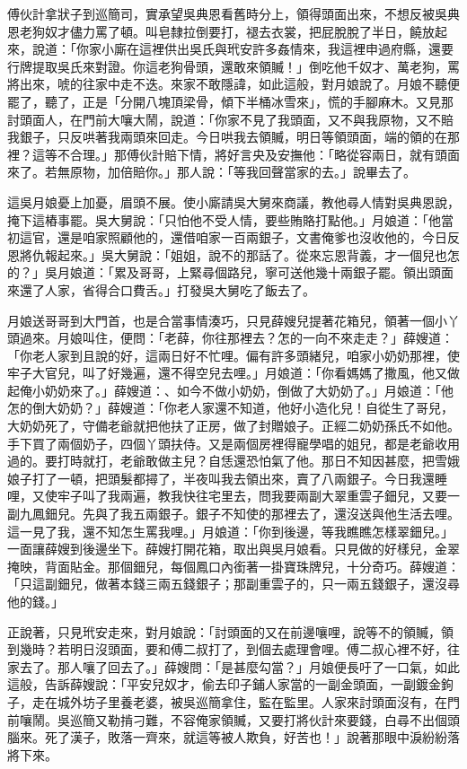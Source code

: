 \begin{showcontents}{}
傅伙計拿狀子到巡簡司，實承望吳典恩看舊時分上，領得頭面出來，不想反被吳典恩老狗奴才儘力罵了頓。叫皂隸拉倒要打，褪去衣裳，把屁脫脫了半日，饒放起來，說道：「你家小廝在這裡供出吳氏與玳安許多姦情來，我這裡申過府縣，還要行牌提取吳氏來對證。你這老狗骨頭，還敢來領贓！」倒吃他千奴才、萬老狗，罵將出來，唬的往家中走不迭。來家不敢隱諱，如此這般，對月娘說了。月娘不聽便罷了，聽了，正是「分開八塊頂梁骨，傾下半桶冰雪來」，慌的手腳麻木。又見那討頭面人，在門前大嚷大鬧，說道：「你家不見了我頭面，又不與我原物，又不賠我銀子，只反哄著我兩頭來回走。今日哄我去領贓，明日等領頭面，端的領的在那裡？這等不合理。」那傅伙計賠下情，將好言央及安撫他：「略從容兩日，就有頭面來了。若無原物，加倍賠你。」那人說：「等我回聲當家的去。」說畢去了。

這吳月娘憂上加憂，眉頭不展。使小廝請吳大舅來商議，教他尋人情對吳典恩說，掩下這樁事罷。吳大舅說：「只怕他不受人情，要些賄賂打點他。」月娘道：「他當初這官，還是咱家照顧他的，還借咱家一百兩銀子，文書俺爹也沒收他的，今日反恩將仇報起來。」吳大舅說：「姐姐，說不的那話了。從來忘恩背義，才一個兒也怎的？」吳月娘道：「累及哥哥，上緊尋個路兒，寧可送他幾十兩銀子罷。領出頭面來還了人家，省得合口費舌。」打發吳大舅吃了飯去了。

月娘送哥哥到大門首，也是合當事情湊巧，只見薛嫂兒提著花箱兒，領著一個小丫頭過來。月娘叫住，便問：「老薛，你往那裡去？怎的一向不來走走？」薛嫂道： 「你老人家到且說的好，這兩日好不忙哩。偏有許多頭緒兒，咱家小奶奶那裡，使牢子大官兒，叫了好幾遍，還不得空兒去哩。」月娘道：「你看媽媽了撒風，他又做起俺小奶奶來了。」薛嫂道：、如今不做小奶奶，倒做了大奶奶了。」月娘道：「他怎的倒大奶奶？」薛嫂道：「你老人家還不知道，他好小造化兒！自從生了哥兒，大奶奶死了，守備老爺就把他扶了正房，做了封贈娘子。正經二奶奶孫氏不如他。手下買了兩個奶子，四個丫頭扶侍。又是兩個房裡得寵學唱的姐兒，都是老爺收用過的。要打時就打，老爺敢做主兒？自恁還恐怕氣了他。那日不知因甚麼，把雪娥娘子打了一頓，把頭髮都撏了，半夜叫我去領出來，賣了八兩銀子。今日我還睡哩，又使牢子叫了我兩遍，教我快往宅里去，問我要兩副大翠重雲子鈿兒，又要一副九鳳鈿兒。先與了我五兩銀子。銀子不知使的那裡去了，還沒送與他生活去哩。這一見了我，還不知怎生罵我哩。」月娘道：「你到後邊，等我瞧瞧怎樣翠鈿兒。」一面讓薛嫂到後邊坐下。薛嫂打開花箱，取出與吳月娘看。只見做的好樣兒，金翠掩映，背面貼金。那個鈿兒，每個鳳口內銜著一掛寶珠牌兒，十分奇巧。薛嫂道：「只這副鈿兒，做著本錢三兩五錢銀子；那副重雲子的，只一兩五錢銀子，還沒尋他的錢。」

正說著，只見玳安走來，對月娘說：「討頭面的又在前邊嚷哩，說等不的領贓，領到幾時？若明日沒頭面，要和傅二叔打了，到個去處理會哩。傅二叔心裡不好，往家去了。那人嚷了回去了。」薛嫂問：「是甚麼勾當？」月娘便長吁了一口氣，如此這般，告訴薛嫂說：「平安兒奴才，偷去印子鋪人家當的一副金頭面，一副鍍金鉤子，走在城外坊子里養老婆，被吳巡簡拿住，監在監里。人家來討頭面沒有，在門前嚷鬧。吳巡簡又勒掯刁難，不容俺家領贓，又要打將伙計來要錢，白尋不出個頭腦來。死了漢子，敗落一齊來，就這等被人欺負，好苦也！」說著那眼中淚紛紛落將下來。


\end{showcontents}
